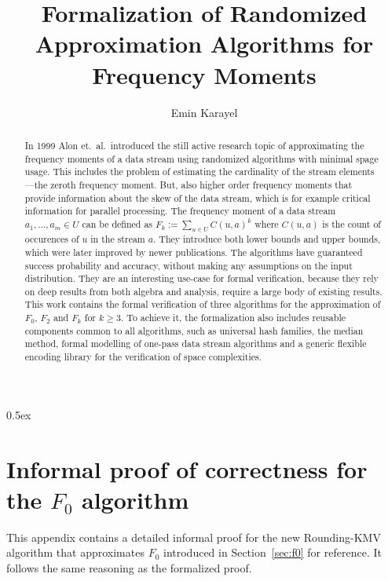 \documentclass[11pt,a4paper]{article}
\begin{document}
\title{Formalization of Randomized Approximation Algorithms for Frequency Moments}
\author{Emin Karayel}
\maketitle
\begin{abstract}
In 1999 Alon et.\ al.\ introduced the still active research topic of approximating the frequency moments of a data stream using randomized algorithms with minimal spage usage.
This includes the problem of estimating the cardinality of the stream elements---the zeroth frequency moment.
But, also higher order frequency moments that provide information about the skew of the data stream, which is for example critical information for parallel processing.
The frequency moment of a data stream $a_1, \ldots, a_m \in U$ can be defined as $F_k := \sum_{u \in U} C(u,a)^k$ where $C(u,a)$ is the count of occurences of $u$ in the stream $a$.
They introduce both lower bounds and upper bounds, which were later improved by newer publications.
The algorithms have guaranteed success probability and accuracy, without making any assumptions on the input distribution.
They are an interesting use-case for formal verification, because they rely on deep results from both algebra and analysis, require a large body of existing results.
This work contains the formal verification of three algorithms for the approximation of $F_0$, $F_2$ and $F_k$ for $k \geq 3$.
To achieve it, the formalization also includes reusable components common to all algorithms, such as universal hash families, the median method, formal modelling of one-pass data stream algorithms and a generic flexible encoding library for the verification of space complexities.
\end{abstract}

\tableofcontents

\parindent 0pt\parskip 0.5ex


\appendix
\section{Informal proof of correctness for the $F_0$ algorithm\label{sec:f0_proof}}
This appendix contains a detailed informal proof for the new Rounding-KMV algorithm that approximates $F_0$
introduced in Section~\ref{sec:f0} for reference. It follows the same reasoning as the formalized proof.
\end{document}
